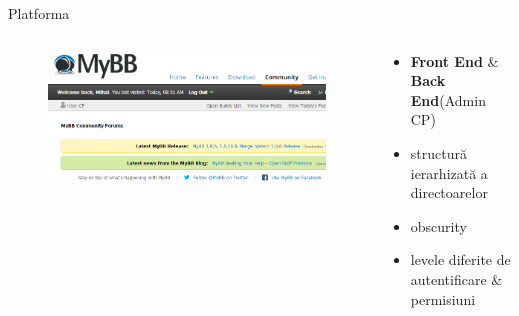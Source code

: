 \documentclass[9pt]{beamer}
\begin{document}
\begin{frame}{Platforma}
  \begin{columns}
    \begin{column}[c]{0.50\textwidth}
      \begin{figure}
        \includegraphics[scale=0.3]{figures/screen2}
      \end{figure}
    \end{column}
    \begin{column}[c]{0.50\textwidth}
        \begin{itemize}
		\vskip10pt
		\item \textbf{Front End} \& \textbf{Back End}(Admin CP)
		\vskip10pt
		\item structură ierarhizată a directoarelor
		\vskip10pt
		\item obscurity
		\vskip10pt
		\item levele diferite de autentificare \& permisiuni
	\end{itemize}
    \end{column}
  \end{columns}
\end{frame}
\end{document}
